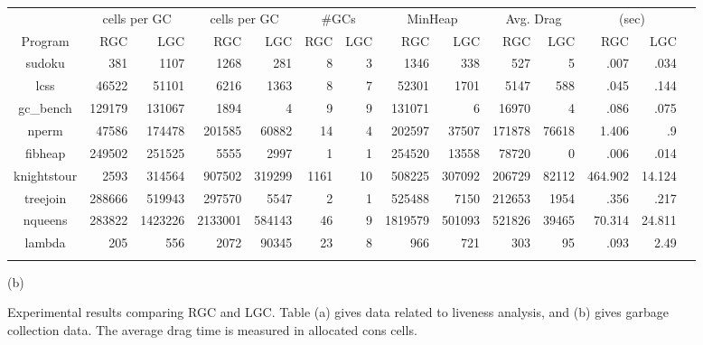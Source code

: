 \documentclass[9pt]{sigplanconf}
\begin{document}
\begin{figure}[t]
{\begin{tabular}{| c | r | r | r | r | r | r  |  r | r |
r | r | r | r | r |}
                            &   \multicolumn{2}{c|}{cells per GC}
                            &   \multicolumn{2}{c|}{cells per GC}
                            &   \multicolumn{2}{c|}{\#GCs}
                            &   \multicolumn{2}{c|}{MinHeap}
                            &   \multicolumn{2}{c|}{Avg. Drag}
                            &   \multicolumn{2}{c|}{(sec)} \\
\cline{2-13}
{Program}    &
RGC & LGC & RGC & LGC  & RGC & LGC  &   RGC & LGC & RGC & LGC & RGC &
LGC \\
\hline
\hline
    {\sf   sudoku}  &381 &1107 &1268 &281 &8 &3 & 1346  &338 &527 &5
&.007 & .034 \\
    {\sf  lcss } & 46522 &51101 &6216 &1363&8&7& 52301  &1701 &5147
&588 &.045 & .144 \\
    {\sf   gc\_bench}  &129179 &131067 &1894 &4&9&9& 131071   &6 &16970
 &4 &.086 & .075 \\
     {\sf  nperm}  & 47586  &174478 &201585 &60882&14&4& 202597  &37507
&171878 &76618 &1.406 & .9  \\
    {\sf  fibheap} &249502  &251525 &5555 &2997&1&1& 254520  &13558
&78720 &0 &.006 & .014  \\
    {\sf  knightstour}  &2593 &314564 &907502 &319299&1161&10&508225
&307092 &206729 &82112 &464.902 & 14.124  \\
    {\sf  treejoin} & 288666  &519943 &297570 &5547&2&1& 525488  &7150
&212653 &1954 &.356 & .217 \\
    {\sf   nqueens} & 283822 &1423226 &2133001 &584143&46&9& 1819579
&501093 &521826 &39465 &70.314 & 24.811 \\
    {\sf   lambda}  &205 & 556 &2072&90345 &23 &8&966 & 721  &303 &95
&.093 &2.49  \\
\\
 \hline
\end{tabular}}


\centerline{(b)}
\vskip -2mm
\caption{Experimental results comparing RGC and LGC. Table (a) gives
  data related to liveness analysis, and (b) gives garbage collection
  data. The average drag time is measured in allocated cons cells.}
\label{fig:experimental-results}
\normalsize
\end{figure}

\end{document}
